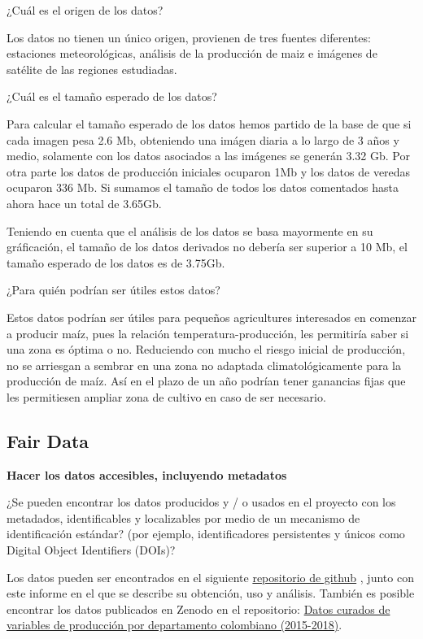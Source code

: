 \documentclass[12pt, spanish]{article}
\begin{document}
\begin{shaded}
¿Cuál es el origen de los datos?
\end{shaded}
Los datos no tienen un único origen, provienen de tres fuentes diferentes: estaciones meteorológicas, análisis de la producción de maiz e imágenes de satélite de las regiones estudiadas.

\begin{shaded}
¿Cuál es el tamaño esperado de los datos?
\end{shaded}

Para calcular el tamaño esperado de los datos hemos partido de la base de que si cada imagen pesa 2.6 Mb, obteniendo una imágen diaria a lo largo de 3 años y medio, solamente con los datos asociados a las imágenes se generán 3.32 Gb. Por otra parte los datos de producción iniciales ocuparon 1Mb y los datos de veredas ocuparon 336 Mb. Si sumamos el tamaño de todos los datos comentados hasta ahora hace un total de 3.65Gb.

Teniendo en cuenta que el análisis de los datos se basa mayormente en su gráficación, el tamaño de los datos derivados no debería ser superior a 10 Mb, el tamaño esperado de los datos es de 3.75Gb.

\begin{shaded}
¿Para quién podrían ser útiles estos datos?
\end{shaded}
Estos datos podrían ser útiles para pequeños agricultures interesados en comenzar a producir maíz, pues la relación temperatura-producción, les permitiría saber si una zona es óptima o no. Reduciendo con mucho el riesgo inicial de producción, no se arriesgan a sembrar en una zona no adaptada climatológicamente para la producción de maíz. Así en el plazo de un año podrían tener ganancias fijas que les permitiesen ampliar zona de cultivo en caso de ser necesario.

\newpage
\subsection{Fair Data}





\textbf{Hacer los datos accesibles, incluyendo metadatos}

\begin{shaded}
¿Se pueden encontrar los datos producidos y / o usados en el proyecto con los metadados, identificables y localizables por medio de un mecanismo  de identificación estándar? (por ejemplo, identificadores persistentes y únicos como Digital Object Identifiers (DOIs)?
\end{shaded}
Los datos pueden ser encontrados en el siguiente \href{{https://github.com/javialonsaso/maiz_CO}}{repositorio de github} , junto con este informe en el que se describe su obtención, uso y análisis. También es posible encontrar los datos publicados en Zenodo en el repositorio: \href{{10.5281/zenodo.3611494}}{Datos curados de variables de producción por departamento colombiano (2015-2018)}.
\end{document}
